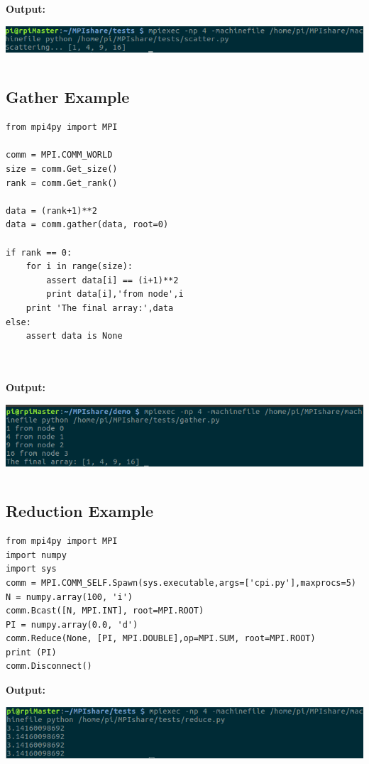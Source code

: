 \bf{Output:}
\begin{center}
\includegraphics[scale=0.7]{Figures/scatter-output}
\end{center}

\begin{verbatim}

\end{verbatim}

\subsection {Gather Example}
\label{appendix:gather}

\begin{verbatim}
from mpi4py import MPI

comm = MPI.COMM_WORLD
size = comm.Get_size()
rank = comm.Get_rank()

data = (rank+1)**2
data = comm.gather(data, root=0)

if rank == 0:
	for i in range(size):
		assert data[i] == (i+1)**2
		print data[i],'from node',i
	print 'The final array:',data
else:
	assert data is None



\end{verbatim}

\bf{Output:}
\begin{center}
\includegraphics[scale=0.7]{Figures/gather-output}
\end{center}

\begin{verbatim}

\end{verbatim}

\subsection {Reduction Example}

\label{appendix:reduction}
\begin{verbatim}
from mpi4py import MPI
import numpy
import sys
comm = MPI.COMM_SELF.Spawn(sys.executable,args=['cpi.py'],maxprocs=5)
N = numpy.array(100, 'i')
comm.Bcast([N, MPI.INT], root=MPI.ROOT)
PI = numpy.array(0.0, 'd')
comm.Reduce(None, [PI, MPI.DOUBLE],op=MPI.SUM, root=MPI.ROOT)
print (PI)
comm.Disconnect()
\end{verbatim}

\bf{Output:}
\begin{center}
\includegraphics[scale=0.7]{Figures/reduce-output}
\end{center}

\begin{verbatim}

\end{verbatim}